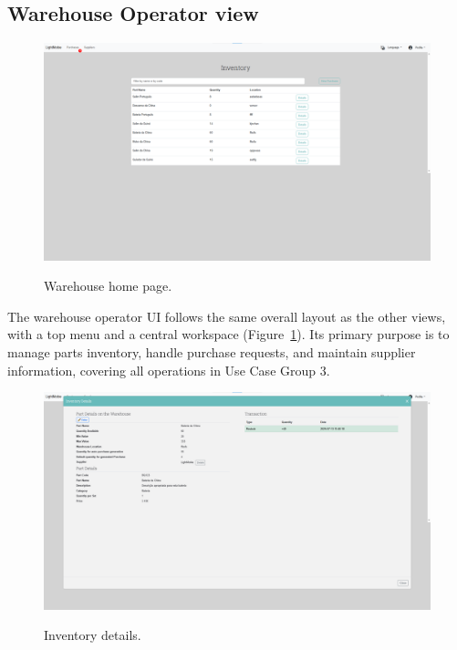 \subsection{Warehouse Operator view}


\begin{figure}[h]
  \caption{Warehouse home page.}
  \centering
  \includegraphics[width=\textwidth]{figs/Implementation/warehouse/homepage}
  \label{fig:warehouseHomepage}
\end{figure}



The warehouse operator \ac{UI} follows the same overall layout as the other views, with a top menu and a central workspace (Figure~\ref{fig:warehouseHomepage}). Its primary purpose is to manage parts inventory, handle purchase requests, and maintain supplier information, covering all operations in Use Case Group 3.


\begin{figure}[h]
  \caption{Inventory details.}
  \centering
  \includegraphics[width=\textwidth]{figs/Implementation/warehouse/inventoryDetails}
  \label{fig:inventoryDetails}
\end{figure}



